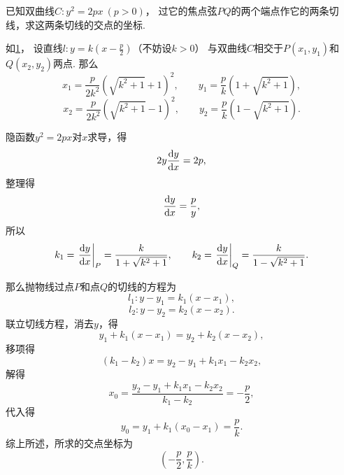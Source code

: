 \begin{example}
已知双曲线\(C: y^2 = 2px\ (p>0)\)，
过它的焦点弦\(PQ\)的两个端点作它的两条切线，求这两条切线的交点的坐标.
\begin{solution}
如\cref{figure:导数与微分.抛物线[y^2=2px]的焦点弦与切线}，
设直线\(l: y=k\left(x-\frac{p}{2}\right)\)（不妨设\(k>0\)）
与双曲线\(C\)相交于\(P(x_1,y_1)\)和\(Q(x_2,y_2)\)两点.
那么\[
	x_1 = \frac{p}{2 k^2} (\sqrt{k^2+1} + 1)^2,
	\qquad
	y_1 = \frac{p}{k} (1+\sqrt{k^2+1}),
\]\[
	x_2 = \frac{p}{2 k^2} (\sqrt{k^2+1} - 1)^2,
	\qquad
	y_2 = \frac{p}{k} (1-\sqrt{k^2+1}).
\]

隐函数\(y^2 = 2px\)对\(x\)求导，得\[
	2 y \dv{y}{x} = 2 p,
\]
整理得\[
	\dv{y}{x} = \frac{p}{y},
\]
所以\[
	k_1 = \eval{\dv{y}{x}}_P
	= \frac{k}{1+\sqrt{k^2+1}},
	\qquad
	k_2 = \eval{\dv{y}{x}}_Q
	= \frac{k}{1-\sqrt{k^2+1}}.
\]

那么抛物线过点\(P\)和点\(Q\)的切线的方程为\[
	l_1: y-y_1 = k_1 (x-x_1),
\]\[
	l_2: y-y_2 = k_2 (x-x_2).
\]
联立切线方程，消去\(y\)，得\[
	y_1 + k_1(x - x_1) = y_2 + k_2(x - x_2),
\]
移项得\[
	(k_1 - k_2) x = y_2 - y_1 + k_1 x_1 - k_2 x_2,
\]
解得\[
	x_0 = \frac{y_2 - y_1 + k_1 x_1 - k_2 x_2}{k_1 - k_2}
	= -\frac{p}{2},
\]
代入得\[
	y_0 = y_1 + k_1(x_0 - x_1)
	= \frac{p}{k}.
\]
综上所述，所求的交点坐标为\[
	\left(-\frac{p}{2},\frac{p}{k}\right).
\]
\end{solution}
\end{example}
\begin{figure}[ht]
	\centering
	\pgfmathsetmacro{\b}{\p/\k}
	\pgfmathsetmacro{\sb}{\p/\k}%
	\caption{}
	\label{figure:导数与微分.抛物线[y^2=2px]的焦点弦与切线}
\end{figure}


